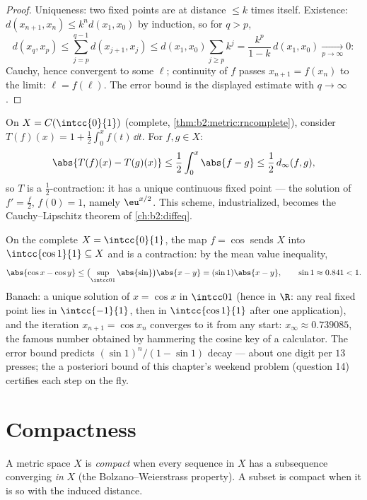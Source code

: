 \begin{proof}
Uniqueness: two fixed points are at distance $\leq k$ times itself.
Existence: $d(x_{n+1}, x_n) \leq k^n d(x_1, x_0)$ by induction, so
for $q > p$,
\[
d(x_q, x_p) \leq \sum_{j=p}^{q-1} d(x_{j+1}, x_j)
\leq d(x_1, x_0) \sum_{j \geq p} k^j
= \frac{k^p}{1-k}\, d(x_1, x_0) \xrightarrow[p\to\infty]{} 0 :
\]
Cauchy, hence convergent to some $\ell$; continuity of $f$ passes
$x_{n+1} = f(x_n)$ to the limit: $\ell = f(\ell)$. The error bound
is the displayed estimate with $q \to \infty$.
\end{proof}

\begin{example}\label{ex:b2:metric:integralequation}
On $X = C(\intcc{0}{1})$ (complete,
\cref{thm:b2:metric:rncomplete}), consider $T(f)(x) = 1 + \frac12
\int_0^x f(t)\,\dd t$. For $f, g \in X$:
\[
\abs{T(f)(x) - T(g)(x)} \leq \frac12 \int_0^x \abs{f - g} \leq
\frac12\, d_\infty(f, g),
\]
so $T$ is a $\frac12$-contraction: it has a unique continuous fixed
point --- the solution of $f' = \frac f2$, $f(0) = 1$, namely
$\eu^{x/2}$. This scheme, industrialized, becomes the
Cauchy--Lipschitz theorem of \cref{ch:b2:diffeq}.
\end{example}

\begin{example}[A numerical fixed point: $x = \cos x$]\label{ex:b2:metric:cosfix}
On the complete $X = \intcc{0}{1}$, the map $f = \cos$ sends $X$
into $\intcc{\cos 1}{1} \subseteq X$ and is a contraction: by the
mean value inequality,
\[
\abs{\cos x - \cos y} \leq \bigl(\sup_{\intcc01}\abs{\sin}\bigr)
\abs{x - y} = (\sin 1)\abs{x - y},
\qquad \sin 1 \approx 0.841 < 1 .
\]
Banach: a unique solution of $x = \cos x$ in $\intcc01$ (hence in
$\R$: any real fixed point lies in $\intcc{-1}{1}$, then in
$\intcc{\cos 1}{1}$ after one application), and the iteration
$x_{n+1} = \cos x_n$ converges to it from any start: $x_\infty
\approx 0.739085$, the famous number obtained by hammering the
cosine key of a calculator. The error bound predicts
$(\sin1)^n/(1 - \sin1)$ decay --- about one digit per $13$
presses; the a posteriori bound of this chapter's weekend
problem (question 14) certifies each step on the fly.
\end{example}

\section{Compactness}

\begin{definition}\label{def:b2:metric:compact}
A metric space $X$ is \emph{compact}
when every sequence in $X$ has a subsequence converging \emph{in}
$X$ (the Bolzano--Weierstrass property). A subset is compact when it
is so with the induced distance.
\end{definition}

